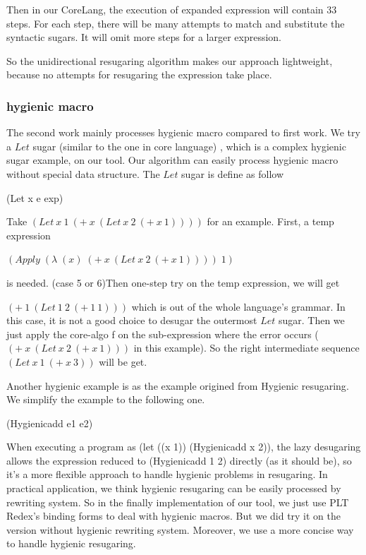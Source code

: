 Then in our CoreLang, the execution of expanded expression will contain 33 steps. For each step, there will be many attempts to match and substitute the syntactic sugars. It will omit more steps for a larger expression. 

So the unidirectional resugaring algorithm makes our approach lightweight, because no attempts for resugaring the expression take place.
\subsubsection{hygienic macro}
\label{mark:hygienic}

The second work\cite{hygienic} mainly processes hygienic macro compared to first work. We try a $Let$ sugar (similar to the one in core language) , which is a complex hygienic sugar example, on our tool. Our algorithm can easily process hygienic macro without special data structure. The $Let$ sugar is define as follow
\begin{Codes}
	(Let x e exp) 
\end{Codes}

Take $(Let~x~1~(+~x~(Let~x~2~(+~x~1))))$ for an example. First, a temp expression

$(Apply\;(\lambda\;(x)\;(+~x~(Let~x~2~(+~x~1))))\;1)$

is needed. (case 5 or 6)Then one-step try on the temp expression, we will get

$(+~1~(Let~1~2~(+~1~1)))$ which is out of the whole language's grammar. In this case, it is not a good choice to desugar the outermost $Let$ sugar. Then we just apply the core-algo f on the sub-expression where the error occurs ($(+~x~(Let~x~2~(+~x~1)))$ in this example). So the right intermediate sequence $(Let~x~1~(+~x~3))$ will be get.

Another hygienic example is as the example origined from Hygienic resugaring\cite{hygienic}. We simplify the example to the following one.
\begin{Codes}
	(Hygienicadd e1 e2) 
\end{Codes}

When executing a program as (let ((x 1)) (Hygienicadd x 2)), the lazy desugaring allows the expression reduced to (Hygienicadd 1 2) directly (as it should be), so it's a more flexible approach to handle hygienic problems in resugaring.
In practical application, we think hygienic resugaring can be easily processed by rewriting system. So in the finally implementation of our tool, we just use PLT Redex's binding forms to deal with hygienic macros. But we did try it on the version without hygienic rewriting system. Moreover, we use a more concise way to handle hygienic resugaring.

